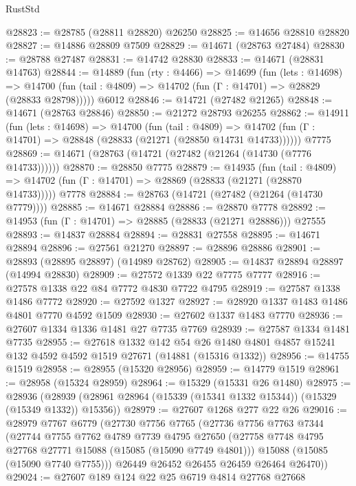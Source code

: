 \begin{lexlean}{RustStd}
\begin{coremodule}
@28823 := @28785 (@28811 @28820) @26250
@28825 := @14656 @28810 @28820
@28827 := @14886 @28809 @7509
@28829 := @14671 (@28763 @27484)
@28830 := @28788 @27487
@28831 := @14742 @28830
@28833 := @14671 (@28831 @14763)
@28844 := @14889
    (fun (rty : @4466) =>
    @14699
      (fun (lets : @14698) =>
      @14700 (fun (tail : @4809) => @14702 (fun (Γ : @14701) => @28829 (@28833 @28798)))))
    @6012
@28846 := @14721 (@27482 @21265)
@28848 := @14671 (@28763 @28846)
@28850 := @21272 @28793 @26255
@28862 := @14911
    (fun (lets : @14698) =>
    @14700
      (fun (tail : @4809) =>
      @14702 (fun (Γ : @14701) => @28848 (@28833 (@21271 (@28850 @14731 @14733))))))
    @7775
@28869 := @14671 (@28763 (@14721 (@27482 (@21264 (@14730 (@7776 @14733))))))
@28870 := @28850 @7775
@28879 := @14935
    (fun (tail : @4809) => @14702 (fun (Γ : @14701) => @28869 (@28833 (@21271 (@28870 @14733)))))
    @7778
@28884 := @28763 (@14721 (@27482 (@21264 (@14730 @7779))))
@28885 := @14671 @28884
@28886 := @28870 @7778
@28892 := @14953 (fun (Γ : @14701) => @28885 (@28833 (@21271 @28886))) @27555
@28893 := @14837 @28884
@28894 := @28831 @27558
@28895 := @14671 @28894
@28896 := @27561 @21270
@28897 := @28896 @28886
@28901 := @28893 (@28895 @28897) (@14989 @28762)
@28905 := @14837 @28894 @28897 (@14994 @28830)
@28909 := @27572 @1339 @22 @7775 @7777
@28916 := @27578 @1338 @22 @84 @7772 @4830 @7722 @4795
@28919 := @27587 @1338 @1486 @7772
@28920 := @27592 @1327
@28927 := @28920 @1337 @1483 @1486 @4801 @7770 @4592 @1509
@28930 := @27602 @1337 @1483 @7770
@28936 := @27607 @1334 @1336 @1481 @27 @7735 @7769
@28939 := @27587 @1334 @1481 @7735
@28955 := @27618
    @1332
    @142
    @54
    @26
    @1480
    @4801
    @4857
    @15241
    @132
    @4592
    @4592
    @1519
    @27671
    (@14881 (@15316 @1332))
@28956 := @14755 @1519
@28958 := @28955 (@15320 @28956)
@28959 := @14779 @1519
@28961 := @28958 (@15324 @28959)
@28964 := @15329 (@15331 @26 @1480)
@28975 := @28936
    (@28939 (@28961 @28964 (@15339 (@15341 @1332 @15344)) (@15329 (@15349 @1332)) @15356))
@28979 := @27607 @1268 @277 @22 @26
@29016 := @28979
    @7767
    @6779
    (@27730
      @7756
      @7765
      (@27736
        @7756
        @7763
        @7344
        (@27744
          @7755
          @7762
          @4789
          @7739
          @4795
          @27650
          (@27758 @7748 @4795 @27768 @27771 @15088 (@15085 (@15090 @7749 @4801)))
          @15088
          (@15085 (@15090 @7740 @7755)))
        @26449
        @26452
        @26455
        @26459
        @26464
        @26470))
@29024 := @27607 @189 @124 @22 @25 @6719 @4814 @27768 @27668

\end{coremodule}
\end{lexlean}
